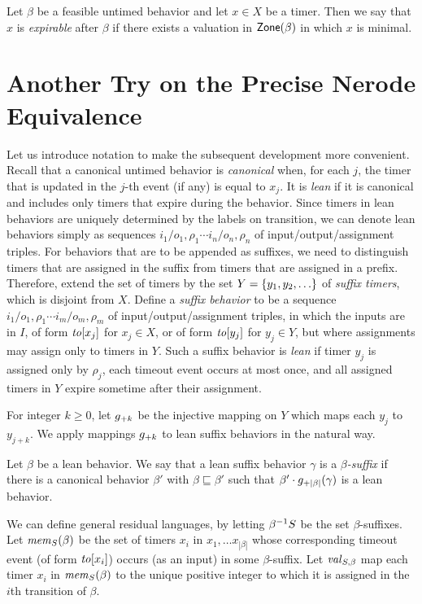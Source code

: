 Let $\beta$ be a feasible untimed behavior and let $x \in X$ be a timer. Then we say that $x$ is \emph{expirable} after $\beta$
if there exists a valuation in $\mathsf{Zone}({\beta})$ in which $x$ is minimal.



\section{Another Try on the Precise Nerode Equivalence}

Let us introduce notation to make the subsequent development more convenient. 
Recall that a canonical untimed behavior is \emph{canonical} when, for each $j$,
the timer that is updated in the $j$-th event (if any) is equal to $x_j$.
It is {\em lean} if it is canonical and
includes only timers that expire during the behavior. 
Since timers in lean behaviors are uniquely determined by the labels on
transition, we can denote lean behaviors simply as sequences
$i_1/o_1,\rho_1 \cdots i_n/o_n,\rho_n$ of input/output/assignment triples.
For behaviors that are to be appended as suffixes, we need to distinguish
timers that are assigned in the suffix from timers that are assigned in a prefix.
Therefore, extend the set of timers by the set $Y = \lbrace y_1,y_2,\ldots\rbrace$ of
{\em suffix timers}, which is disjoint from $X$.
Define a {\em suffix behavior} to be a sequence
$i_1/o_1,\rho_1 \cdots i_m/o_m,\rho_m$ of input/output/assignment triples,
in which the inputs are in $I$, of form $\mathit{to}[x_j]$ for $x_j \in X$, or
of form $\mathit{to}[y_j]$ for $y_j \in Y$, but where assignments may assign only
to timers in $Y$. Such a suffix behavior is {\em lean} if
timer $y_j$ is assigned only by $\rho_j$, each timeout event occurs at most once, and all assigned timers in $Y$ expire sometime after their assignment.

For integer $k \geq 0$, let $g_{+{k}}$ be the injective mapping on
$Y$ which maps each $y_j$ to $y_{j+k}$.  We apply mappings $g_{+{k}}$ to
lean suffix behaviors in the natural way.

Let $\beta$ be a lean behavior. We say that 
a lean suffix behavior $\gamma$ is a {\em $\beta$-suffix} if
there is a canonical behavior $\beta'$ with $\beta \sqsubseteq \beta'$ such that
$\beta'\cdot g_{+{|\beta|}}(\gamma)$ is a lean behavior.

We can define general residual languages, by letting
${\beta}^{-1}{S}$ be the set $\beta$-suffixes.
Let $\mathit{mem}_{S}(\beta)$ be the set of timers $x_i$ in
$x_1 , \ldots x_{|\beta|}$ whose corresponding timeout event
(of form $\mathit{to}[x_i]$) occurs (as an input) in some $\beta$-suffix.
Let $\mathit{val}_{S,\beta}$ map each timer $x_i$ in
$\mathit{mem}_{S}(\beta)$ to the unique positive integer to which it
is assigned in the $i$th transition of $\beta$.

